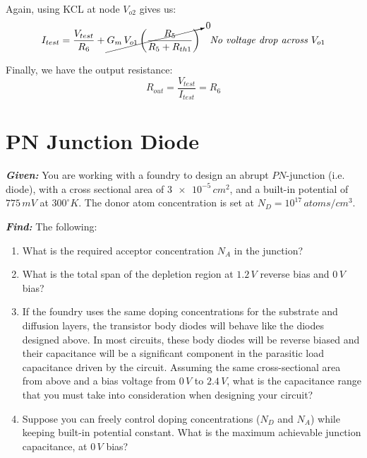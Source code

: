 \documentclass[12pt, fleqn]{article}
\begin{document}
\begin{enumerate}[label=(\alph*)]
{\begin{figure}[H]
        \label{fig:full_thev_test}
        \end{figure}
        Again, using KCL at node $V_{o2}$ gives us:
        \begin{align*}
            I_{test} &= \frac{V_{test}}{R_6} + \cancelto{0}{G_m\,V_{o1} \left(\frac{R_5}{R_5 + R_{th1}}\right)}
            &\textit{No voltage drop across $V_{o1}$}
        \end{align*}
        }
        Finally, we have the output resistance:
        \begin{equation*}
            \boxed{R_{out} = \frac{V_{test}}{I_{test}} = R_6}
        \end{equation*}
\end{enumerate}
\newpage
\section{PN Junction Diode}
\textbf{\emph{Given: }} You are working with a foundry to design an abrupt $PN$-junction (i.e. diode), with a cross sectional area of $\num{3e-5}\,{cm}^2$, and a built-in potential of $775\,mV$ at $300^\circ K$. The donor atom concentration is set at $N_D = 10^{17}\,atoms / {cm}^3$.

\vspace{0.5cm}
\noindent
\textbf{\emph{Find: }} The following:

\begin{enumerate}[label=(\alph*)]
    \item{What is the required acceptor concentration $N_A$ in the junction?}
    \item{What is the total span of the depletion region at $1.2\,V$ reverse bias and $0\,V$ bias?}
    \item{If the foundry uses the same doping concentrations for the substrate and diffusion layers, the transistor body diodes will behave like the diodes designed above. In most circuits, these body diodes will be reverse biased and their capacitance will be a significant component in the parasitic load capacitance driven by the circuit. Assuming the same cross-sectional area from above and a bias voltage from $0\,V$ to $2.4\,V$, what is the capacitance range that you must take into consideration when designing your circuit?}
    \item{Suppose you can freely control doping concentrations ($N_D$ and $N_A$) while keeping built-in potential constant.  What is the maximum achievable junction capacitance, at $0\,V$ bias?}
\end{enumerate}
\end{document}
